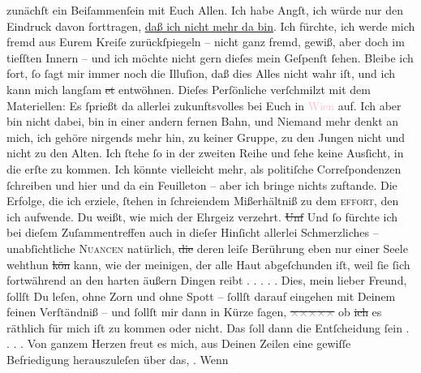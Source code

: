 \documentclass[twoside=false,titlepage=false,open=any, parskip=never, fontsize=12pt, headings=small, chapterprefix=false, appendixprefix=false]{scrbook}
\newcommand{\strikeout}[1]{\sout{#1}}
\newcommand{\dotsfive}{%
.\kern\ellipsisgap 
.\kern\ellipsisgap
.\kern\ellipsisgap
.\kern\ellipsisgap 
.\kern\ellipsisgap 
\relax}
\newcommand{\dotsfour}{%
.\kern\ellipsisgap 
.\kern\ellipsisgap
.\kern\ellipsisgap
.\kern\ellipsisgap 
\relax}
\newcommand{\Theight}{\dimexpr\fontcharht\font`W}
\newcommand{\pbposition}{\depth}
\newcommand{\pb}{\nobreak\hspace{0pt}\raisebox{-0.1em}{\raisebox{\pbposition}{\textnormal{|}}}\nobreak\hspace{0pt}}
\newcommand{\introOben}{\textnormal{\raisebox{\Theight}{\raisebox{-\height}{\small{v}\normalsize}}}}
\begin{document}
               zunächſt ein Beiſammenſein mit Euch Allen. Ich habe Angſt, ich würde nur den Eindruck
               davon forttragen, \uline{daß ich nicht mehr da bin}. Ich
               fürchte, ich werde mich fremd aus Eurem Kreiſe zurückſpiegeln – nicht ganz fremd,
               gewiß, {\pb}aber doch im tiefſten Innern – und ich
               möchte nicht gern \introOben{}dieſes\introOben{} mein Geſpenſt ſehen. Bleibe ich
               fort, ſo ſagt mir immer noch die Illuſion, daß dies Alles nicht wahr iſt, und ich
               kann mich langſam \strikeout{et} entwöhnen. Dieſes Perſönliche
               verſchmilzt mit dem Materiellen: Es ſprießt da allerlei zukunftsvolles bei Euch in
                  \textcolor{pink}{Wien}{}\ledrightnote{\textcolor{pink}{Wien}} auf. Ich aber bin nicht dabei, bin in einer
               andern fernen Bahn, und Niemand mehr denkt an mich, ich gehöre nirgends mehr hin, zu
               keiner Gruppe, zu den Jungen nicht und nicht zu den Alten. Ich ſtehe ſo {\pb}in der zweiten Reihe und ſehe keine Ausſicht, in die
               erſte zu kommen. Ich könnte vielleicht mehr, als politiſche Correſpondenzen ſchreiben
               und hier und da ein Feuilleton – aber ich bringe nichts zuftande. Die Erfolge, die
               ich erziele, ſtehen in ſchreiendem Mißerhältniß zu dem \textsc{effort}, den ich aufwende. Du weißt, wie mich der Ehrgeiz verzehrt. \strikeout{Unſ} Und ſo fürchte ich bei dieſem Zuſammentreffen auch
               in dieſer Hinſicht allerlei Schmerzliches – unabſichtliche \textsc{Nuancen} natürlich, \strikeout{die} deren leiſe Berührung
               eben nur einer Seele wehthun \strikeout{kön} kann, wie der
               meinigen, der alle Haut abgeſchunden iſt, weil ſie ſich fortwährend an den harten {\pb}äußern Dingen reibt{\dotsfive}\pend
           \pstart
           Dies, mein lieber Freund, ſollſt Du leſen, ohne Zorn und ohne Spott – ſollſt darauf
               eingehen mit Deinem feinen Verſtändniß – und ſollſt mir dann in Kürze ſagen, \strikeout{\textcolor{gray}{×}\-\textcolor{gray}{×}\-\textcolor{gray}{×}\-\textcolor{gray}{×}\-\textcolor{gray}{×}} ob
                  \strikeout{ich} es räthlich für mich iſt zu kommen oder nicht.
               Das ſoll dann die Entſcheidung ſein{\dotsfour}\pend
           \pstart
           Von ganzem Herzen freut es mich, aus Deinen Zeilen eine gewiſſe Befriedigung
               herauszuleſen über das, \label{K_L02608-4v}\label{K_L02608-4h}. Wenn
\end{document}
